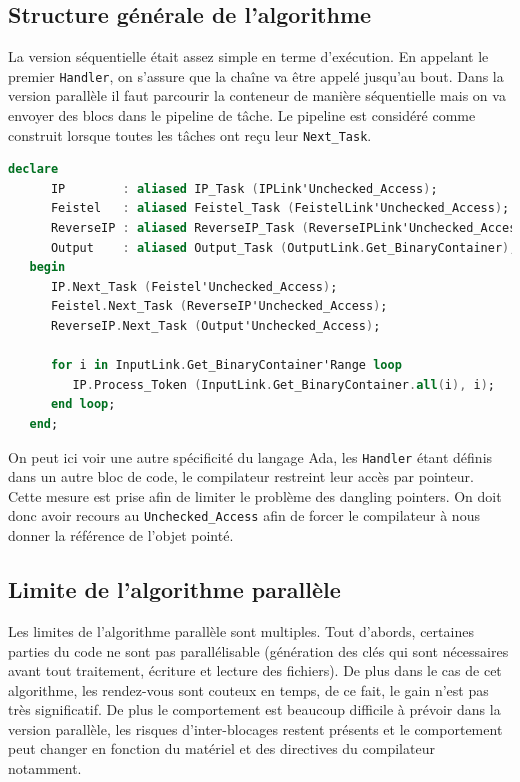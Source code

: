 \documentclass[a4paper]{article}
\begin{document}
\subsection{Structure générale de l'algorithme}
La version séquentielle était assez simple en terme d'exécution. En appelant le premier \texttt{Handler}, on s'assure que la chaîne va être appelé jusqu'au bout. Dans la version parallèle il faut parcourir la conteneur de manière séquentielle mais on va envoyer des blocs dans le pipeline de tâche.
\smallskip
Le pipeline est considéré comme construit lorsque toutes les tâches ont reçu leur \texttt{Next\_Task}.

\begin{lstlisting}[language=ada]
   declare
      IP        : aliased IP_Task (IPLink'Unchecked_Access);
      Feistel   : aliased Feistel_Task (FeistelLink'Unchecked_Access);
      ReverseIP : aliased ReverseIP_Task (ReverseIPLink'Unchecked_Access);
      Output    : aliased Output_Task (OutputLink.Get_BinaryContainer);
   begin
      IP.Next_Task (Feistel'Unchecked_Access);
      Feistel.Next_Task (ReverseIP'Unchecked_Access);
      ReverseIP.Next_Task (Output'Unchecked_Access);
      
      for i in InputLink.Get_BinaryContainer'Range loop
         IP.Process_Token (InputLink.Get_BinaryContainer.all(i), i);
      end loop;
   end;
\end{lstlisting}
On peut ici voir une autre spécificité du langage Ada, les \texttt{Handler} étant définis dans un autre bloc de code, le compilateur restreint leur accès par pointeur. Cette mesure est prise afin de limiter le problème des dangling pointers. On doit donc avoir recours au \texttt{Unchecked\_Access} afin de forcer le compilateur à nous donner la référence de l'objet pointé.
\subsection{Limite de l'algorithme parallèle}
Les limites de l'algorithme parallèle sont multiples. Tout d'abords, certaines parties du code ne sont pas parallélisable (génération des clés qui sont nécessaires avant tout traitement, écriture et lecture des fichiers). De plus dans le cas de cet algorithme, les rendez-vous sont couteux en temps, de ce fait, le gain n'est pas très significatif. 
\smallbreak
De plus le comportement est beaucoup difficile à prévoir dans la version parallèle, les risques d'inter-blocages restent présents et le comportement peut changer en fonction du matériel et des directives du compilateur notamment.
\end{document}
